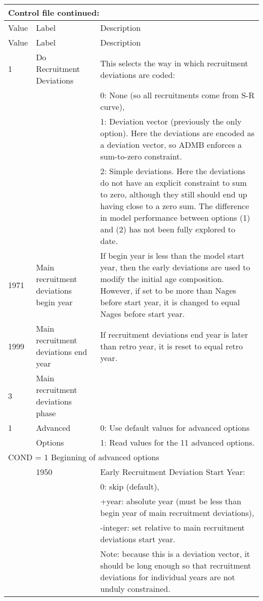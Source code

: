 \begin{longtable}{p{1cm} p{3cm} p{11cm}}
	\multicolumn{3}{l}{Control file continued:}\\

	\hline
	Value & Label &  Description\Tstrut\Bstrut\\
	\hline
	\endfirsthead

	\hline
	Value & Label &  Description\Tstrut\Bstrut\\
	\hline
	\endhead
	\hline
	\endfoot
	\endlastfoot


	1 \Tstrut & Do Recruitment Deviations & This selects the way in which recruitment deviations are coded:\\
	  &  & 0:  None (so all recruitments come from S-R curve),\\
	  &  & 1:  Deviation vector (previously the only option).  Here the deviations are encoded as a deviation vector, so ADMB enforces a sum-to-zero constraint.\\
	  &  & 2:  Simple deviations.  Here the deviations do not have an explicit constraint to sum to zero, although they still should end up having close to a zero sum.  The difference in model performance between options (1) and (2) has not been fully explored to date.\Bstrut\\
	\hline

	1971 \Tstrut & Main recruitment deviations begin year & If begin year is less than the model start year, then the early deviations are used to modify the initial age composition.   However, if set to be more than Nages before start year, it is changed to equal Nages before start year. \Bstrut\\
	\hline

	1999 \Tstrut & Main recruitment deviations end year & If recruitment deviations end year is later than retro year, it is reset to equal retro year.\Bstrut\\
	\hline

	3 \Tstrut & Main recruitment deviations phase & \Bstrut\\
	\hline

	1 \Tstrut & Advanced  & 0: Use default values for advanced options \\
	  & Options  & 1: Read values for the 11 advanced options.\Bstrut\\
	\hline

	\multicolumn{3}{l}{COND = 1 Beginning of advanced options}\Tstrut\Bstrut\\
	& 1950 & Early Recruitment Deviation Start Year: \\
	&  & 0: skip (default), \\
	&  & +year:  absolute year (must be less than begin year of main recruitment deviations),\\
	&  & -integer:  set relative to main recruitment deviations start year.\\
	&  & Note: because this is a deviation vector, it should be long enough so that recruitment deviations for individual years are not unduly constrained. \\


\end{longtable}
